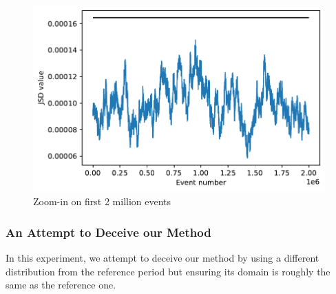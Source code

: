 \documentclass[sigconf]{acmart}
\begin{document}
\begin{figure}[!htb]
    \begin{center}
      \includegraphics[scale=0.5]{figures/stream-analysis-viz-zoom-test04.pdf}
      \caption{Zoom-in on first 2 million events}
    \label{fig:JSD-signal-zoom-test04}
    \end{center}
\end{figure}


\subsubsection{An Attempt to Deceive our Method}
In this experiment, we attempt to deceive our method by using a different distribution from the reference period but ensuring its domain is roughly the same as the reference one. 
\end{document}

